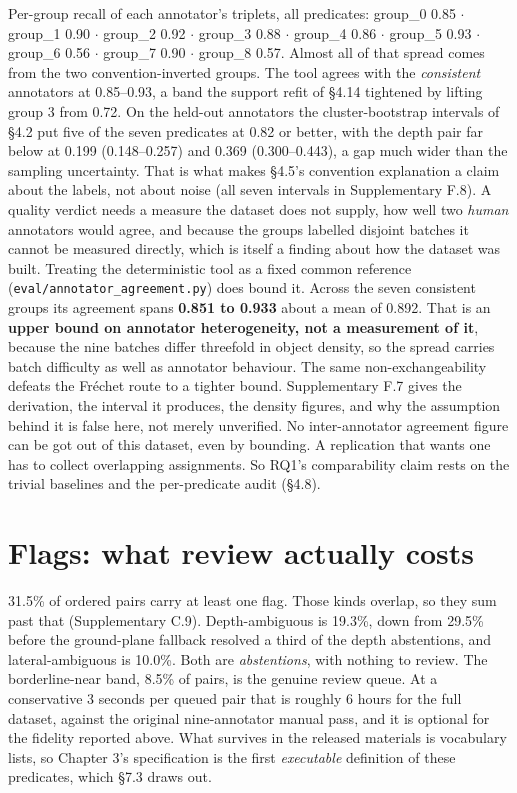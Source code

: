 Per-group recall of each annotator's triplets, all predicates: group\_\allowbreak{}0 0.85 $\cdot$ group\_\allowbreak{}1 0.90 $\cdot$ group\_\allowbreak{}2 0.92 $\cdot$ group\_\allowbreak{}3 0.88 $\cdot$ group\_\allowbreak{}4 0.86 $\cdot$ group\_\allowbreak{}5 0.93 $\cdot$ group\_\allowbreak{}6 0.56 $\cdot$ group\_\allowbreak{}7 0.90 $\cdot$ group\_\allowbreak{}8 0.57. Almost all of that spread comes from the two convention-inverted groups. The tool agrees with the \textit{consistent} annotators at 0.85--0.93, a band the support refit of \S{}4.14 tightened by lifting group 3 from 0.72. On the held-out annotators the cluster-bootstrap intervals of \S{}4.2 put five of the seven predicates at 0.82 or better, with the depth pair far below at 0.199 (0.148--0.257) and 0.369 (0.300--0.443), a gap much wider than the sampling uncertainty. That is what makes \S{}4.5's convention explanation a claim about the labels, not about noise (all seven intervals in Supplementary F.8). A quality verdict needs a measure the dataset does not supply, how well two \textit{human} annotators would agree, and because the groups labelled disjoint batches it cannot be measured directly, which is itself a finding about how the dataset was built. Treating the deterministic tool as a fixed common reference (\texttt{eval/annotator\_\allowbreak{}agreement.py}) does bound it. Across the seven consistent groups its agreement spans \textbf{0.851 to 0.933} about a mean of 0.892. That is an \textbf{upper bound on annotator heterogeneity, not a measurement of it}, because the nine batches differ threefold in object density, so the spread carries batch difficulty as well as annotator behaviour. The same non-exchangeability defeats the Fréchet route to a tighter bound. Supplementary F.7 gives the derivation, the interval it produces, the density figures, and why the assumption behind it is false here, not merely unverified. No inter-annotator agreement figure can be got out of this dataset, even by bounding. A replication that wants one has to collect overlapping assignments. So RQ1's comparability claim rests on the trivial baselines and the per-predicate audit (\S{}4.8).

\section{Flags: what review actually costs}

31.5\% of ordered pairs carry at least one flag. Those kinds overlap, so they sum past that (Supplementary C.9). Depth-ambiguous is 19.3\%, down from 29.5\% before the ground-plane fallback resolved a third of the depth abstentions, and lateral-ambiguous is 10.0\%. Both are \textit{abstentions}, with nothing to review. The borderline-near band, 8.5\% of pairs, is the genuine review queue. At a conservative 3 seconds per queued pair that is roughly 6 hours for the full dataset, against the original nine-annotator manual pass, and it is optional for the fidelity reported above. What survives in the released materials is vocabulary lists, so Chapter 3's specification is the first \textit{executable} definition of these predicates, which \S{}7.3 draws out.

